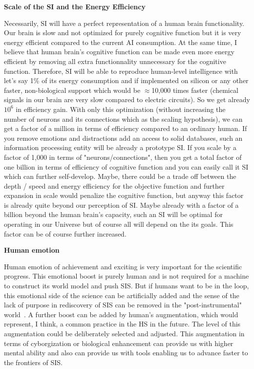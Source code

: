 \documentclass[a4paper,11pt]{article}
\begin{document}
\textbf{Scale of the SI and the Energy Efficiency}

Necessarily, SI will have a perfect representation of a human brain functionality. Our brain is slow and not optimized for purely cognitive function but it is very energy efficient compared to the current AI consumption. At the same time, I believe that human brain's cognitive function can be made even more energy efficient by removing all extra functionnality unnecessary for the cognitive function. Therefore, SI will be able to reproduce human-level intelligence with let's say 1\% of its energy consumption and if implemented on silicon or any other faster, non-biological support which would be $\approx$10,000 times faster (chemical signals in our brain are very slow compared to electric circuits). So we get already $10^6$ in efficiency gain.
With only this optimization (without increasing the number of neurons and its connections which as the scaling hypothesis), we can get a factor of a million in terms of efficiency compared to an ordinary human. If you remove emotions and distractions add an access to solid databases, such an information processing entity will be already a prototype SI. If you scale by a factor of 1,000 in terms of "neurons/connections", then you get a total factor of one billion in terms of efficiency of cognitive function and you can easily call it SI which can further self-develop. Maybe, there could be a trade off between the depth / speed and energy efficiency for the objective function and further expansion in scale would penalize the cognitive function, but anyway this factor is already quite beyond our perception of SI. Maybe already with a factor of a billion beyond the human brain's capacity, such an SI will be optimal for operating in our Universe but of course all will depend on the its goals. This factor can be of course further increased.

\textbf{Human emotion}

Human emotion of achievement and exciting is very important for the scientific progress. This emotional boost is purely human and is not required for a machine to construct its world model and push SIS. But if humans want to be in the loop, this emotional side of the science can be artificially added and the sense of the lack of purpose in rediscovery of SIS can be removed in the "post-instrumental" world~\parencite{DeepUtopia}. A further boost can be added by human's augmentation, which would represent, I think, a common practice in the HS in the future. The level of this augmentation could be deliberately selected and adjusted. This augmentation in terms of cyborgization or biological enhancement can provide us with higher mental ability and also can provide us with tools enabling us to advance faster to the frontiers of SIS.
\end{document}
